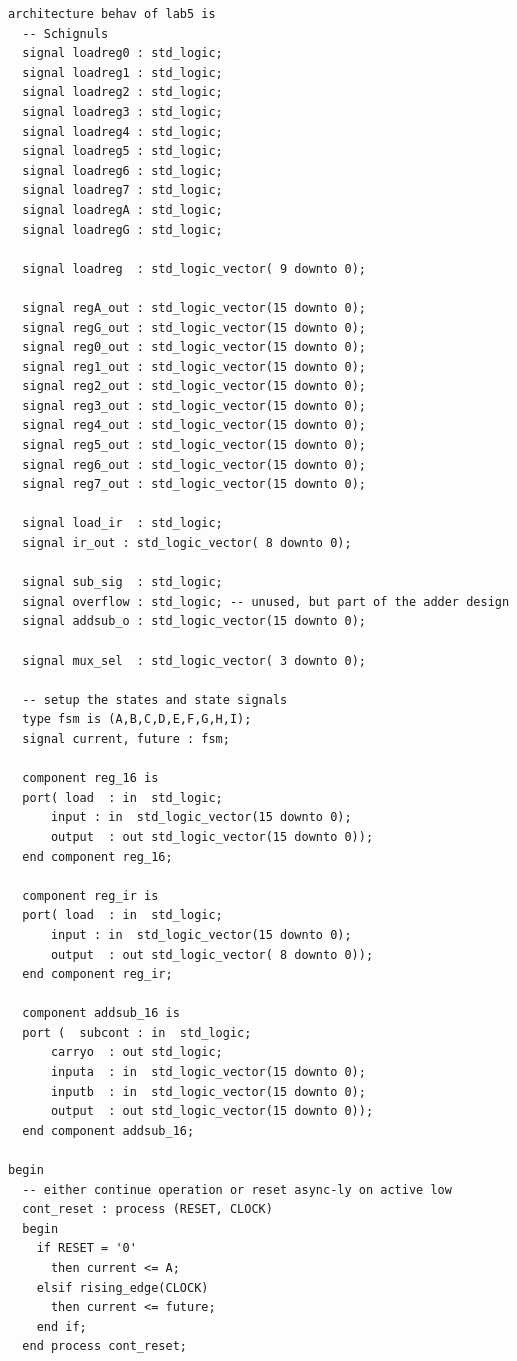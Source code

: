 \documentclass[11pt]{report}
\begin{document}
\begin{spacing}{1.5}
\begin{lstlisting}
architecture behav of lab5 is
  -- Schignuls
  signal loadreg0 : std_logic;
  signal loadreg1 : std_logic;
  signal loadreg2 : std_logic;
  signal loadreg3 : std_logic;
  signal loadreg4 : std_logic;
  signal loadreg5 : std_logic;
  signal loadreg6 : std_logic;
  signal loadreg7 : std_logic;
  signal loadregA : std_logic;
  signal loadregG : std_logic;
  
  signal loadreg  : std_logic_vector( 9 downto 0);

  signal regA_out : std_logic_vector(15 downto 0);
  signal regG_out : std_logic_vector(15 downto 0);
  signal reg0_out : std_logic_vector(15 downto 0);
  signal reg1_out : std_logic_vector(15 downto 0);
  signal reg2_out : std_logic_vector(15 downto 0);
  signal reg3_out : std_logic_vector(15 downto 0);
  signal reg4_out : std_logic_vector(15 downto 0);
  signal reg5_out : std_logic_vector(15 downto 0);
  signal reg6_out : std_logic_vector(15 downto 0);
  signal reg7_out : std_logic_vector(15 downto 0);

  signal load_ir  : std_logic;
  signal ir_out : std_logic_vector( 8 downto 0);

  signal sub_sig  : std_logic;
  signal overflow : std_logic; -- unused, but part of the adder design
  signal addsub_o : std_logic_vector(15 downto 0);

  signal mux_sel  : std_logic_vector( 3 downto 0);

  -- setup the states and state signals
  type fsm is (A,B,C,D,E,F,G,H,I);
  signal current, future : fsm;

  component reg_16 is
  port( load  : in  std_logic;
      input : in  std_logic_vector(15 downto 0);
      output  : out std_logic_vector(15 downto 0));
  end component reg_16;

  component reg_ir is
  port( load  : in  std_logic;
      input : in  std_logic_vector(15 downto 0);
      output  : out std_logic_vector( 8 downto 0));
  end component reg_ir;

  component addsub_16 is
  port (  subcont : in  std_logic;
      carryo  : out std_logic;
      inputa  : in  std_logic_vector(15 downto 0);
      inputb  : in  std_logic_vector(15 downto 0);
      output  : out std_logic_vector(15 downto 0));
  end component addsub_16;

begin
  -- either continue operation or reset async-ly on active low
  cont_reset : process (RESET, CLOCK)
  begin
    if RESET = '0'
      then current <= A;
    elsif rising_edge(CLOCK)
      then current <= future;
    end if;
  end process cont_reset;


\end{lstlisting}
\end{spacing}
\end{document}
